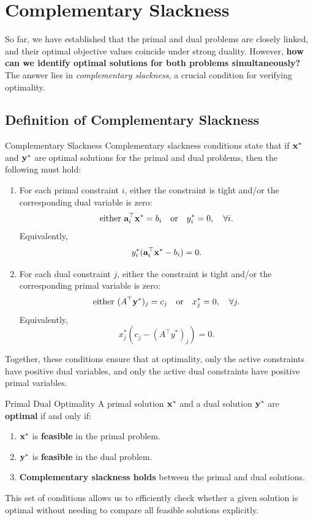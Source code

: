 \section{Complementary Slackness}

So far, we have established that the primal and dual problems are closely linked, and their optimal objective values coincide under strong duality. However, 	\textbf{how can we identify optimal solutions for both problems simultaneously?} The answer lies in 	\textit{complementary slackness}, a crucial condition for verifying optimality.

\subsection{Definition of Complementary Slackness}
\begin{definition}{Complementary Slackness}{}
Complementary slackness conditions state that if \( \mathbf{x}^* \) and \( \mathbf{y}^* \) are optimal solutions for the primal and dual problems, then the following must hold:

\begin{enumerate}
\item For each primal constraint \( i \), either the constraint is tight and/or the corresponding dual variable is zero:
\[
\mbox{either } \mathbf{a}_i^\top \mathbf{x}^* = b_i \quad \mbox{or} \quad y_i^* = 0, \quad \forall i.
\]
Equivalently, 
\[
y_i^* (\mathbf{a}_i^\top \mathbf{x}^* - b_i) = 0.
\]

\item For each dual constraint \( j \), either the constraint is tight and/or the corresponding primal variable is zero:
\[
\mbox{either } (A^\top \mathbf{y}^*)_j = c_j \quad \mbox{or} \quad x_j^* = 0, \quad \forall j.
\]
Equivalently, 
\[
x_j^* (c_j - (A^\top y^*)_j) = 0.
\]
\end{enumerate}
\end{definition}

Together, these conditions ensure that at optimality, only the active constraints have positive dual variables, and only the active dual constraints have positive primal variables.
\begin{theorem}{Primal Dual Optimality}{}
A primal solution $\mathbf{x}^*$ and a dual solution $\mathbf{y}^*$ are 	\textbf{optimal} if and only if:
\begin{enumerate}
\item $\mathbf{x}^*$ is 	\textbf{feasible} in the primal problem.
\item $\mathbf{y}^*$ is 	\textbf{feasible} in the dual problem.
\item 	\textbf{Complementary slackness holds} between the primal and dual solutions.
\end{enumerate}
\end{theorem}
This set of conditions allows us to efficiently check whether a given solution is optimal without needing to compare all feasible solutions explicitly.

